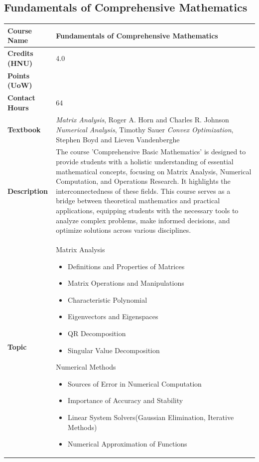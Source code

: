 \documentclass{article}
\begin{document}
\subsection{Fundamentals of Comprehensive Mathematics}
\renewcommand{\arraystretch}{1.5} %
\begin{longtable}{|p{3cm}|p{10cm}|}
\hline
\textbf{Course Name} & Fundamentals of Comprehensive Mathematics \\
\hline
\textbf{Credits (HNU)} & 4.0 \\
\hline
\textbf{Points (UoW)} & \\
\hline
\textbf{Contact Hours} & 64 \\
\hline
\textbf{Textbook} & \emph{Matrix Analysis}, Roger A. Horn and Charles R. Johnson \newline
\emph{Numerical Analysis}, Timothy Sauer \newline
\emph{Convex Optimization}, Stephen Boyd and Lieven Vandenberghe \\
\hline
\textbf{Description} & The course 'Comprehensive Basic Mathematics' is designed to provide students with a holistic understanding of essential mathematical concepts, focusing on Matrix Analysis, Numerical Computation, and Operations Research. It highlights the interconnectedness of these fields. This course serves as a bridge between theoretical mathematics and practical applications, equipping students with the necessary tools to analyze complex problems, make informed decisions, and optimize solutions across various disciplines. \\
\hline
\textbf{Topic} & 
Matrix Analysis
\begin{itemize}
    \item Definitions and Properties of Matrices
    \item Matrix Operations and Manipulations
    \item Characteristic Polynomial
    \item Eigenvectors and Eigenspaces
    \item QR Decomposition
    \item Singular Value Decomposition
\end{itemize}

Numerical Methods
\begin{itemize}
    \item Sources of Error in Numerical Computation
    \item Importance of Accuracy and Stability
    \item Linear System Solvers(Gaussian Elimination, Iterative Methods)
    \item Numerical Approximation of Functions
\end{itemize}


\end{longtable}
\end{document}
